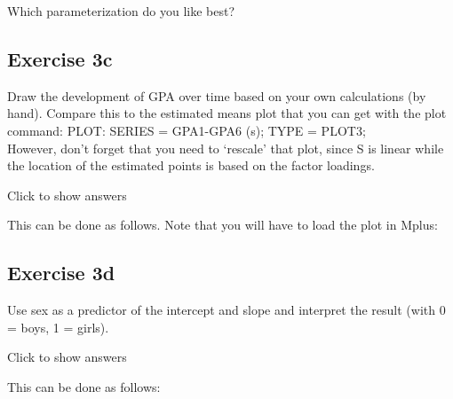 \documentclass[
]{book}
\newenvironment{Shaded}{\begin{snugshade}}{\end{snugshade}}
\newcommand{\AttributeTok}[1]{\textcolor[rgb]{0.77,0.63,0.00}{#1}}
\newcommand{\FunctionTok}[1]{\textcolor[rgb]{0.00,0.00,0.00}{#1}}
\newcommand{\NormalTok}[1]{#1}
\newcommand{\OtherTok}[1]{\textcolor[rgb]{0.56,0.35,0.01}{#1}}
\newcommand{\SpecialCharTok}[1]{\textcolor[rgb]{0.00,0.00,0.00}{#1}}
\newcommand{\StringTok}[1]{\textcolor[rgb]{0.31,0.60,0.02}{#1}}
\begin{document}
Which parameterization do you like best?

\hypertarget{exercise-3c}{%
\subsection{Exercise 3c}\label{exercise-3c}}

Draw the development of GPA over time based on your own calculations (by hand).
Compare this to the estimated means plot that you can get with the plot command:
PLOT: SERIES = GPA1-GPA6 (s);
TYPE = PLOT3;\\
However, don't forget that you need to `rescale' that plot, since S is linear while the location of the
estimated points is based on the factor loadings.

Click to show answers

This can be done as follows. Note that you will have to load the plot in Mplus:

\begin{Shaded}
\end{Shaded}

\hypertarget{exercise-3d}{%
\subsection{Exercise 3d}\label{exercise-3d}}

Use sex as a predictor of the intercept and slope and interpret the result (with 0 = boys, 1 = girls).

Click to show answers

This can be done as follows:
\end{document}
